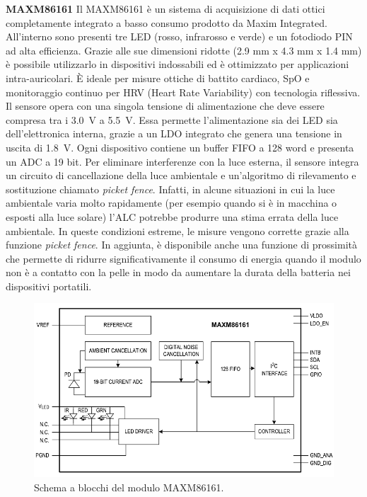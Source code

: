\textbf{MAXM86161} Il MAXM86161 è un sistema di acquisizione di dati ottici completamente integrato a basso consumo prodotto da Maxim Integrated\cite{IntegratedMAXM86161}. All'interno sono presenti tre LED (rosso, infrarosso e verde) e un fotodiodo PIN ad alta efficienza. Grazie alle sue dimensioni ridotte (2.9 mm x 4.3 mm x 1.4 mm) è possibile utilizzarlo in dispositivi indossabili ed è ottimizzato per applicazioni intra-auricolari. \`E ideale per misure ottiche di battito cardiaco, SpO e monitoraggio continuo per HRV (Heart Rate Variability) con tecnologia riflessiva. Il sensore opera con una singola tensione di alimentazione che deve essere compresa tra i \SI{3.0}{\volt} a \SI{5.5}{\volt}. Essa permette l'alimentazione sia dei LED sia dell'elettronica interna, grazie a un LDO integrato che genera una tensione in uscita di \SI{1.8}{\volt}. Ogni dispositivo contiene un buffer FIFO a 128 word e presenta un ADC a 19 bit. Per eliminare interferenze con la luce esterna, il sensore integra un circuito di cancellazione della luce ambientale e un'algoritmo di rilevamento e sostituzione chiamato \textit{picket fence}. Infatti, in alcune situazioni in cui la luce ambientale varia molto rapidamente (per esempio quando si è in macchina o esposti alla luce solare) l'ALC potrebbe produrre una stima errata della luce ambientale. In queste condizioni estreme, le misure vengono corrette grazie alla funzione \textit{picket fence}. In aggiunta, è disponibile anche una funzione di prossimità che permette di ridurre significativamente il consumo di energia quando il modulo non è a contatto con la pelle in modo da aumentare la durata della batteria nei dispositivi portatili. 
\begin{figure}[h]
	\centering
	\includegraphics[width=0.7\linewidth]{ImageFiles/Fotopletismografia/MAXM86161BlockDiagram}
	\caption{Schema a blocchi del modulo MAXM86161.}
	\label{fig:MAXM86161BlockDiagram}
\end{figure}

